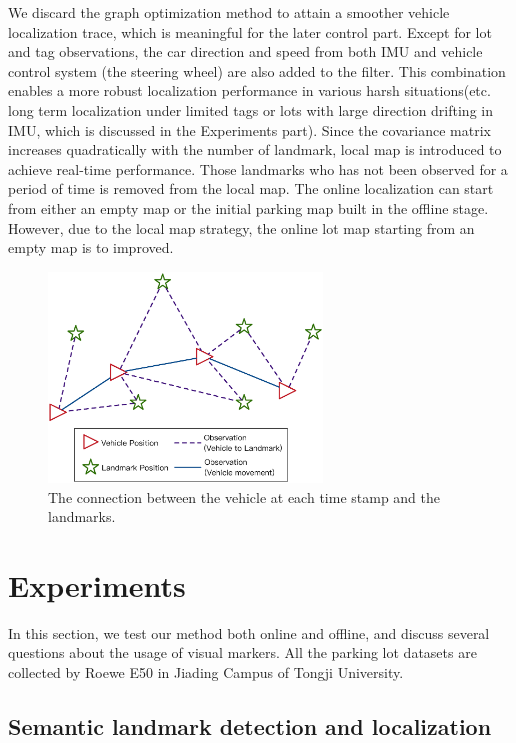 \documentclass[journal]{IEEEtran}
\begin{document}
We discard the graph optimization method to attain a smoother vehicle localization trace, which is meaningful for the later control part. 
Except for lot and tag observations, the car direction and speed from both IMU and vehicle control system (the steering wheel) are also added to the filter. 
This combination enables a more robust localization performance in various harsh situations(etc. long term localization under limited tags or lots with large direction drifting in IMU, which is discussed in the Experiments part). 
Since the covariance matrix increases quadratically with the number of landmark\cite{Bailey2006Simultaneous}, local map is introduced to achieve real-time performance. 
Those landmarks who has not been observed for a period of time is removed from the local map. 
The online localization can start from either an empty map or the initial parking map built in the offline stage. 
However, due to the local map strategy, the online lot map starting from an empty map is to improved.

\begin{figure}
\centering
\includegraphics[height = 2.2in]{pic/fig9_Optimize}
\caption{
The connection between the vehicle at each time stamp and the landmarks.
}\label{fig:9}
\end{figure}



\section{Experiments}
In this section, we test our method both online and offline, and discuss several questions about the usage of visual markers. 
All the parking lot datasets are collected by Roewe E50 in Jiading Campus of Tongji University.
\subsection{Semantic landmark detection and localization}
\end{document}
